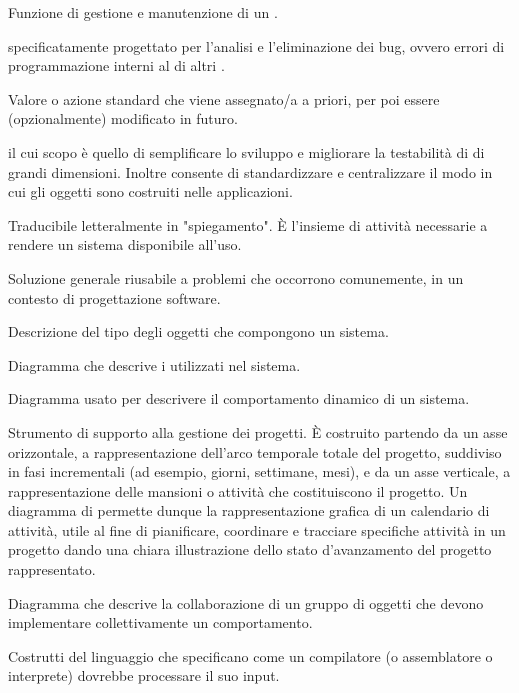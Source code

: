 {Funzione di gestione e manutenzione di un .}

{ specificatamente progettato per l'analisi e l'eliminazione dei bug, ovvero errori di programmazione interni al  di altri .}

{Valore o azione standard che viene assegnato/a a priori, per poi essere (opzionalmente) modificato in futuro.}

{ il cui scopo è quello di semplificare lo sviluppo e migliorare la testabilità di  di grandi dimensioni. Inoltre consente di standardizzare e centralizzare il modo in cui gli oggetti sono costruiti nelle applicazioni.}
 
{Traducibile letteralmente in "spiegamento". \`{E} l'insieme di attività necessarie a rendere un sistema  disponibile all'uso.}

{Soluzione generale riusabile a problemi che occorrono comunemente, in un contesto di progettazione software.}

{Descrizione del tipo degli oggetti che compongono un sistema.}

{Diagramma che descrive i  utilizzati nel sistema.}

{Diagramma  usato per descrivere il comportamento dinamico di un sistema.}

{Strumento di supporto alla gestione dei progetti. \`{E} costruito partendo da un asse orizzontale, a rappresentazione dell'arco temporale totale del progetto, suddiviso in fasi incrementali (ad esempio, giorni, settimane, mesi), e da un asse verticale, a rappresentazione delle mansioni o attività che costituiscono il progetto. Un diagramma di  permette dunque la rappresentazione grafica di un calendario di attività, utile al fine di pianificare, coordinare e tracciare specifiche attività in un progetto dando una chiara illustrazione dello stato d'avanzamento del progetto rappresentato.} 

{Diagramma che descrive la collaborazione di un gruppo di oggetti che devono implementare collettivamente un comportamento.}

{Costrutti del linguaggio che specificano come un compilatore (o assemblatore o interprete) dovrebbe processare il suo input.} 

